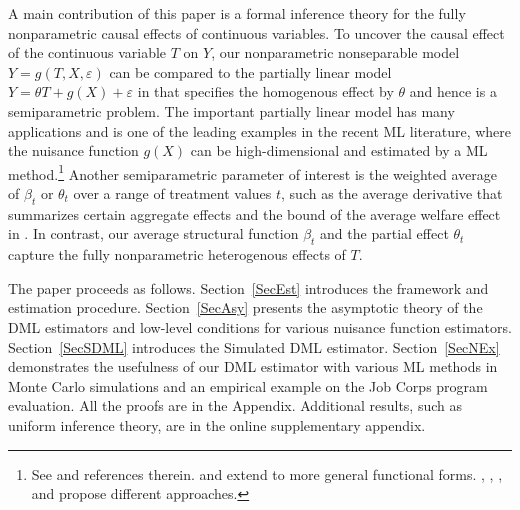 \documentclass[lettersize, 12pt]{article}
\begin{document}
A main contribution of this paper is a formal inference theory for the fully nonparametric causal effects of continuous variables.
To uncover the causal effect of the continuous variable $T$ on $Y$, our nonparametric nonseparable model $Y = g(T,X,\varepsilon)$ can be compared to the partially linear model $Y = \theta T + g(X) + \varepsilon$ in \cite{Robinson} that specifies the homogenous effect by $\theta$ and hence is a semiparametric problem.
The important partially linear model has many applications and is one of the leading examples in the recent ML literature, where the nuisance function $g(X)$ can be high-dimensional and estimated by a ML method.\footnote{
See \cite{CCDDHNR} and references therein.
\cite{DSLC}  and \cite{OSW} extend to more general functional forms.
\cite{CJN18ET}, \cite{CJN18JASA}, \cite{CJM19}, and \cite{FLM2} propose different approaches.
} 
Another semiparametric parameter of interest is the weighted average of $\beta_t$ or $\theta_t$ over a range of treatment values $t$,
such as the average derivative that summarizes certain aggregate effects \citep{PSS89ETA}
and the bound of the average welfare effect in \cite{CHN}. 
In contrast, our average structural function $\beta_t$ and the partial effect $\theta_t$ capture the fully nonparametric  heterogenous effects of $T$.




The paper proceeds as follows.  Section~\ref{SecEst} introduces the framework and estimation procedure. 
Section~\ref{SecAsy} presents the asymptotic theory of the DML estimators and low-level conditions for various nuisance function estimators.
Section~\ref{SecSDML} introduces the Simulated DML estimator.  
Section~\ref{SecNEx} demonstrates the usefulness of our DML estimator with various ML methods
in Monte Carlo simulations and an empirical example on the Job Corps program evaluation.
All the proofs are in the Appendix.
Additional results, such as uniform inference theory, are in the online supplementary appendix.
\end{document}
